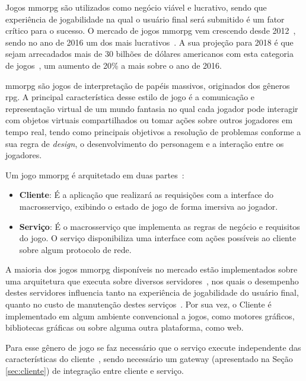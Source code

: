 Jogos \ac{mmorpg} são utilizados como negócio viável e lucrativo, sendo que experiência de jogabilidade na qual o usuário final será submitido é um fator crítico para o sucesso.
%
O mercado de jogos \ac{mmorpg} vem crescendo desde 2012~\cite{new_york_times}, sendo no ano de 2016 um dos mais lucrativos~\cite{statista_2016}.
%
A sua projeção para 2018 é que sejam arrecadados mais de 30 bilhões de dólares americanos com esta categoria de jogos~\cite{statista_2018}, um aumento de 20\% a mais sobre o ano de 2016.



\ac{mmorpg} são jogos de interpretação de papéis massivos, originados dos gêneros \ac{rpg}.
%
A principal característica desse estilo de jogo é a comunicação e representação virtual de um mundo fantasia no qual cada jogador pode interagir com objetos virtuais compartilhados ou tomar ações sobre outros jogadores em tempo real, tendo como principais objetivos a resolução de problemas conforme a sua regra de \textit{design}, o desenvolvimento do personagem e a interação entre os jogadores\cite{video_game_technologies}.


Um jogo \ac{mmorpg} é arquitetado em duas partes~\cite{mmo_analytic}:
\begin{itemize}
  \item \textbf{Cliente}: É a aplicação que realizará as requisições com a interface do macrosserviço, exibindo o estado de jogo de forma imersiva ao jogador.
  \item \textbf{Serviço}: É o macrosserviço que implementa as regras de negócio e requisitos do jogo.
  O serviço disponibiliza uma interface com ações possíveis ao cliente sobre algum protocolo de rede.
\end{itemize}



A maioria dos jogos \ac{mmorpg} disponíveis no mercado estão implementados sobre uma arquitetura que executa sobre diversos servidores~\cite{stephenclarkewillson2017}, nos quais o desempenho destes servidores influencia tanto na experiência de jogabilidade do usuário final, quanto no custo de manutenção destes serviços~\cite{1417630}.
%
Por sua vez, o Cliente é implementado em algum ambiente convencional a jogos, como motores gráficos, bibliotecas gráficas ou sobre alguma outra plataforma, como web.


Para esse gênero de jogo se faz necessário que o serviço execute independente das características do cliente~\cite{albion_online_unite}, sendo necessário um gateway (apresentado na Seção \ref{sec:cliente}) de integração entre cliente e serviço.


